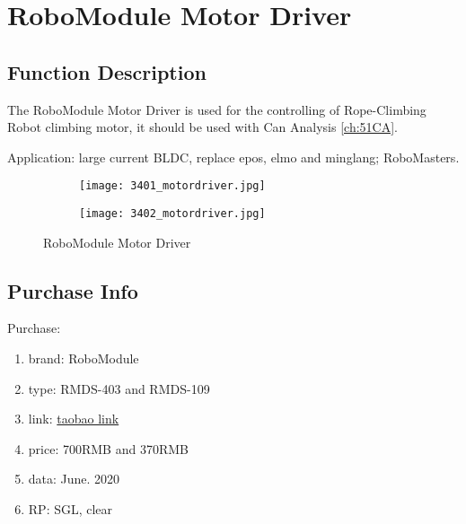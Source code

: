 \setchapterpreamble[u]{\margintoc}
\chapter{RoboModule Motor Driver}

\section{Function Description}
The RoboModule Motor Driver is used for the controlling of Rope-Climbing Robot climbing motor, it should be 
used with Can Analysis \ref{ch:51CA}. 

Application: large current BLDC, replace epos, elmo and minglang; RoboMasters.

\begin{figure}[htb]	
	\centering
	\begin{subfigure}
		\centering
		\texttt{[image: 3401\_motordriver.jpg]}
	\end{subfigure}
	\quad
	\begin{subfigure}
		\centering
		\texttt{[image: 3402\_motordriver.jpg]}
	\end{subfigure}
	\caption[RoboModule Motor Driver]{ 
		RoboModule Motor Driver		
			}\label{fig:340}
\end{figure}
	
\section{Purchase Info}
Purchase:
\begin{enumerate}
	\item brand: RoboModule
	\item type: RMDS-403 and RMDS-109
	\item link: \href{https://item.taobao.com/item.htm?id=43995228864}{taobao link} 
	\item price: 700RMB and 370RMB
	\item data: June. 2020
	\item RP: SGL, clear
\end{enumerate}

